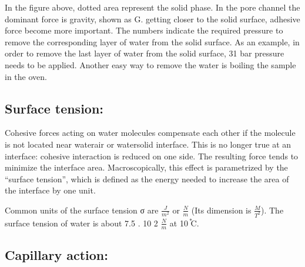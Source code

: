 \documentclass[letterpaper,10pt,english]{sphinxmanual}
\let\sphinxpxdimen\pdfpxdimen\else\newdimen\sphinxpxdimen
\begin{document}
In the figure above, dotted area represent the solid phase. In the pore channel the dominant force is gravity, shown as G. getting closer to the solid surface, adhesive force become more important. The numbers indicate the required pressure to remove the corresponding layer of water from the solid surface. As an example, in order to remove the last layer of water from the solid surface, 31 bar pressure needs to be applied. Another easy way to remove the water is boiling the sample in the oven.


\subsection{Surface tension:}
\label{\detokenize{contents/flow/12_subsurface_structure:surface-tension}}
Cohesive forces acting on water molecules compensate each other if the molecule is not located near water\sphinxhyphen{}air or water\sphinxhyphen{}solid interface. This is no longer true at an interface: cohesive interaction is reduced on one side. The resulting force tends to minimize the interface area. Macroscopically, this effect is parametrized by the “surface tension”, which is defined as the energy needed to increase the area of the interface by one unit.

\noindent{\hspace*{\fill}\sphinxincludegraphics[height=300\sphinxpxdimen]{{L02_fig12}.png}\hspace*{\fill}}

Common units of the surface tension σ are \(\frac{J}{m^2}\) or \(\frac{N}{m}\) (Its dimension is \(\frac{M}{T^2}\)). The surface tension of water is about 7.5 . 10 \sphinxhyphen{}2 \(\frac{N}{m}\) at 10 ֯C.


\subsection{Capillary action:}
\label{\detokenize{contents/flow/12_subsurface_structure:capillary-action}}
\noindent{\hspace*{\fill}\sphinxincludegraphics[height=300\sphinxpxdimen]{{L02_fig13}.png}\hspace*{\fill}}
\end{document}
